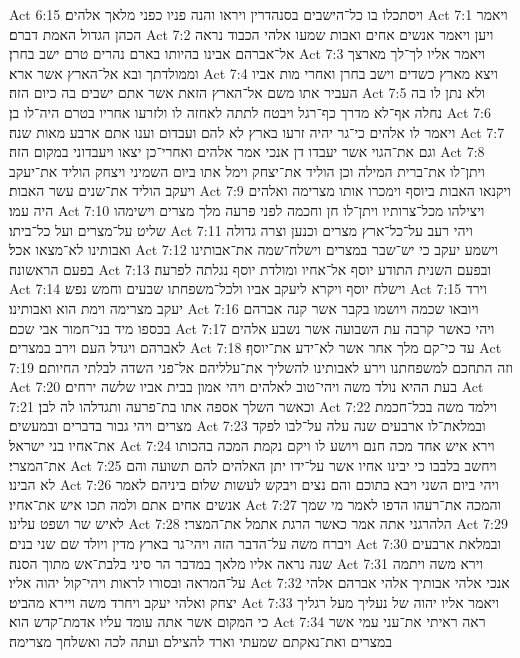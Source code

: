 Act 6:15  ויסתכלו בו כל־הישבים בסנהדרין ויראו והנה פניו כפני מלאך אלהים׃
Act 7:1  ויאמר הכהן הגדול האמת דברם׃
Act 7:2  ויען ויאמר אנשים אחים ואבות שמעו אלהי הכבוד נראה אל־אברהם אבינו בהיותו בארם נהרים טרם ישב בחרן׃
Act 7:3  ויאמר אליו לך־לך מארצך וממולדתך ובא אל־הארץ אשר ארא׃
Act 7:4  ויצא מארץ כשדים וישב בחרן ואחרי מות אביו העביר אתו משם אל־הארץ הזאת אשר אתם ישבים בה כיום הזה׃
Act 7:5  ולא נתן לו בה נחלה אף־לא מדרך כף־רגל ויבטח לתתה לאחזה לו ולזרעו אחריו בטרם היה־לו בן׃
Act 7:6  ויאמר לו אלהים כי־גר יהיה זרעו בארץ לא להם ועבדום וענו אתם ארבע מאות שנה׃
Act 7:7  וגם את־הגוי אשר יעבדו דן אנכי אמר אלהים ואחרי־כן יצאו ויעבדוני במקום הזה׃
Act 7:8  ויתן־לו את־ברית המילה וכן הוליד את־יצחק וימל אתו ביום השמיני ויצחק הוליד את־יעקב ויעקב הוליד את־שנים עשר האבות׃
Act 7:9  ויקנאו האבות ביוסף וימכרו אותו מצרימה ואלהים היה עמו׃
Act 7:10  ויצילהו מכל־צרותיו ויתן־לו חן וחכמה לפני פרעה מלך מצרים וישימהו שליט על־מצרים ועל כל־ביתו׃
Act 7:11  ויהי רעב על־כל־ארץ מצרים וכנען וצרה גדולה ואבותינו לא־מצאו אכל׃
Act 7:12  וישמע יעקב כי יש־שבר במצרים וישלח־שמה את־אבותינו בפעם הראשונה׃
Act 7:13  ובפעם השנית התודע יוסף אל־אחיו ומולדת יוסף נגלתה לפרעה׃
Act 7:14  וישלח יוסף ויקרא ליעקב אביו ולכל־משפחתו שבעים וחמש נפש׃
Act 7:15  וירד יעקב מצרימה וימת הוא ואבותינו׃
Act 7:16  ויובאו שכמה ויושמו בקבר אשר קנה אברהם בכספו מיד בני־חמור אבי שכם׃
Act 7:17  ויהי כאשר קרבה עת השבועה אשר נשבע אלהים לאברהם ויגדל העם וירב במצרים׃
Act 7:18  עד כי־קם מלך אחר אשר לא־ידע את־יוסף׃
Act 7:19  וזה התחכם למשפחתנו וירע לאבותינו להשליך את־עלליהם אל־פני השדה לבלתי החיותם׃
Act 7:20  בעת ההיא נולד משה ויהי־טוב לאלהים ויהי אמון בבית אביו שלשה ירחים׃
Act 7:21  וכאשר השלך אספה אתו בת־פרעה ותגדלהו לה לבן׃
Act 7:22  וילמד משה בכל־חכמת מצרים ויהי גבור בדברים ובמעשים׃
Act 7:23  ובמלאת־לו ארבעים שנה עלה על־לבו לפקד את־אחיו בני ישראל׃
Act 7:24  וירא איש אחד מכה חנם ויושע לו ויקם נקמת המכה בהכותו את־המצרי׃
Act 7:25  ויחשב בלבבו כי יבינו אחיו אשר על־ידו יתן האלהים להם תשועה והם לא הבינו׃
Act 7:26  ויהי ביום השני ויבא בתוכם והם נצים ויבקש לעשות שלום ביניהם לאמר אנשים אחים אתם ולמה תכו איש את־אחיו׃
Act 7:27  והמכה את־רעהו הדפו לאמר מי שמך לאיש שר ושפט עלינו׃
Act 7:28  הלהרגני אתה אמר כאשר הרגת אתמל את־המצרי׃
Act 7:29  ויברח משה על־הדבר הזה ויהי־גר בארץ מדין ויולד שם שני בנים׃
Act 7:30  ובמלאת ארבעים שנה נראה אליו מלאך במדבר הר סיני בלבת־אש מתוך הסנה׃
Act 7:31  וירא משה ויתמה על־המראה ובסורו לראות ויהי־קול יהוה אליו׃
Act 7:32  אנכי אלהי אבותיך אלהי אברהם אלהי יצחק ואלהי יעקב ויחרד משה ויירא מהביט׃
Act 7:33  ויאמר אליו יהוה של נעליך מעל רגליך כי המקום אשר אתה עומד עליו אדמת־קדש הוא׃
Act 7:34  ראה ראיתי את־עני עמי אשר במצרים ואת־נאקתם שמעתי וארד להצילם ועתה לכה ואשלחך מצרימה׃

